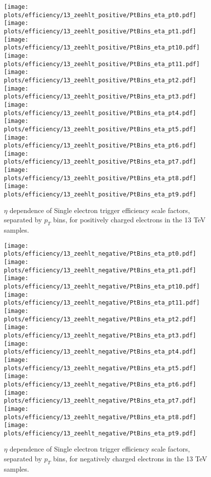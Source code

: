 \begin{figure}
\centering
\texttt{[image: plots/efficiency/13\_zeehlt\_positive/PtBins\_eta\_pt0.pdf]}
\texttt{[image: plots/efficiency/13\_zeehlt\_positive/PtBins\_eta\_pt1.pdf]}
\texttt{[image: plots/efficiency/13\_zeehlt\_positive/PtBins\_eta\_pt10.pdf]}
\texttt{[image: plots/efficiency/13\_zeehlt\_positive/PtBins\_eta\_pt11.pdf]}
\texttt{[image: plots/efficiency/13\_zeehlt\_positive/PtBins\_eta\_pt2.pdf]}
\texttt{[image: plots/efficiency/13\_zeehlt\_positive/PtBins\_eta\_pt3.pdf]}
\texttt{[image: plots/efficiency/13\_zeehlt\_positive/PtBins\_eta\_pt4.pdf]}
\texttt{[image: plots/efficiency/13\_zeehlt\_positive/PtBins\_eta\_pt5.pdf]}
\texttt{[image: plots/efficiency/13\_zeehlt\_positive/PtBins\_eta\_pt6.pdf]}
\texttt{[image: plots/efficiency/13\_zeehlt\_positive/PtBins\_eta\_pt7.pdf]}
\texttt{[image: plots/efficiency/13\_zeehlt\_positive/PtBins\_eta\_pt8.pdf]}
\texttt{[image: plots/efficiency/13\_zeehlt\_positive/PtBins\_eta\_pt9.pdf]}
\caption{$\eta$ dependence of Single electron trigger efficiency scale factors, separated by $p_T$ bins, for positively charged electrons in the 13 TeV samples.}
\label{fig:Eff:el:13:HLT:pos}
\end{figure}
\begin{figure}
\centering
\texttt{[image: plots/efficiency/13\_zeehlt\_negative/PtBins\_eta\_pt0.pdf]}
\texttt{[image: plots/efficiency/13\_zeehlt\_negative/PtBins\_eta\_pt1.pdf]}
\texttt{[image: plots/efficiency/13\_zeehlt\_negative/PtBins\_eta\_pt10.pdf]}
\texttt{[image: plots/efficiency/13\_zeehlt\_negative/PtBins\_eta\_pt11.pdf]}
\texttt{[image: plots/efficiency/13\_zeehlt\_negative/PtBins\_eta\_pt2.pdf]}
\texttt{[image: plots/efficiency/13\_zeehlt\_negative/PtBins\_eta\_pt3.pdf]}
\texttt{[image: plots/efficiency/13\_zeehlt\_negative/PtBins\_eta\_pt4.pdf]}
\texttt{[image: plots/efficiency/13\_zeehlt\_negative/PtBins\_eta\_pt5.pdf]}
\texttt{[image: plots/efficiency/13\_zeehlt\_negative/PtBins\_eta\_pt6.pdf]}
\texttt{[image: plots/efficiency/13\_zeehlt\_negative/PtBins\_eta\_pt7.pdf]}
\texttt{[image: plots/efficiency/13\_zeehlt\_negative/PtBins\_eta\_pt8.pdf]}
\texttt{[image: plots/efficiency/13\_zeehlt\_negative/PtBins\_eta\_pt9.pdf]}
\caption{$\eta$ dependence of Single electron trigger efficiency scale factors, separated by $p_T$ bins, for negatively charged electrons in the 13 TeV samples.}
\label{fig:Eff:el:13:HLT:neg}
\end{figure}
